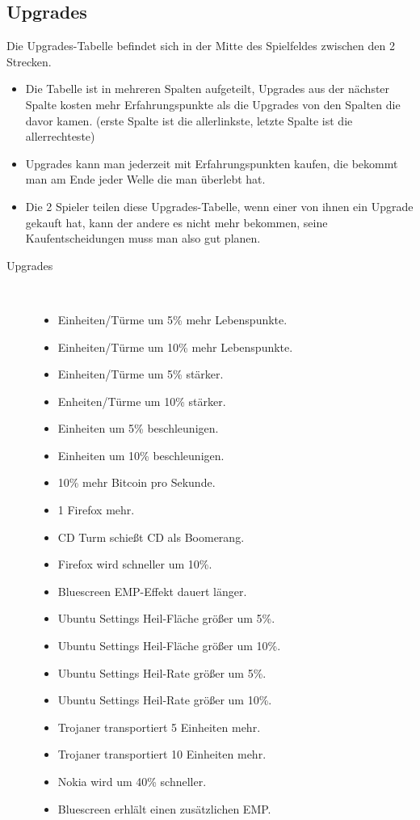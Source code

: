\subsection{Upgrades}
Die Upgrades-Tabelle befindet sich in der Mitte des Spielfeldes zwischen den 2 Strecken. 
\begin{itemize}
\item Die Tabelle ist in mehreren Spalten aufgeteilt, Upgrades aus der nächster Spalte kosten mehr Erfahrungspunkte als die Upgrades von den
Spalten die davor kamen. (erste Spalte ist die allerlinkste, letzte Spalte ist die allerrechteste)
\item Upgrades kann man jederzeit mit Erfahrungspunkten kaufen, die bekommt man am Ende jeder Welle die man überlebt hat.
\item Die 2 Spieler teilen diese Upgrades-Tabelle, wenn einer von ihnen ein Upgrade gekauft hat, kann der
andere es nicht mehr bekommen, seine Kaufentscheidungen muss man also gut planen.
\end{itemize}

\begin{description}
\item[Upgrades]
~\\
\begin{itemize}
	\item Einheiten/Türme um 5\% mehr Lebenspunkte.
	\item Einheiten/Türme um 10\% mehr Lebenspunkte.
	\item Einheiten/Türme um 5\% stärker.
	\item Enheiten/Türme um 10\% stärker.
	\item Einheiten um 5\% beschleunigen.
	\item Einheiten um 10\% beschleunigen.
	\item 10\% mehr Bitcoin pro Sekunde.
	\item 1 Firefox mehr.
	\item CD Turm schießt CD als Boomerang.
	\item Firefox wird schneller um 10\%.
	\item Bluescreen EMP-Effekt dauert länger.
	\item Ubuntu Settings Heil-Fläche größer um 5\%.
	\item Ubuntu Settings Heil-Fläche größer um 10\%.
	\item Ubuntu Settings Heil-Rate größer um 5\%.
	\item Ubuntu Settings Heil-Rate größer um 10\%.
	\item Trojaner transportiert 5 Einheiten mehr.
	\item Trojaner transportiert 10 Einheiten mehr.
	\item Nokia wird um 40\% schneller.
	\item Bluescreen erhlält einen zusätzlichen EMP.
\end{itemize}
\end{description}
